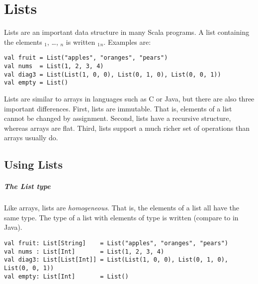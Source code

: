 \chapter{Lists}

Lists are an important data structure in many Scala programs.  
A list containing the elements $_1$, \ldots, $_n$ is written
$_1$$_n$\code{)}. Examples are:
\begin{lstlisting}
val fruit = List("apples", "oranges", "pears")
val nums  = List(1, 2, 3, 4)
val diag3 = List(List(1, 0, 0), List(0, 1, 0), List(0, 0, 1))
val empty = List()
\end{lstlisting}
Lists are similar to arrays in languages such as C or Java, but there
are also three important differences. First, lists are immutable. That
is, elements of a list cannot be changed by assignment. Second, 
lists have a recursive structure, whereas arrays are flat. Third,
lists support a much richer set of operations than arrays usually do.

\section{Using Lists}

\paragraph{The List type}
Like arrays, lists are {\em homogeneous}. That is, the elements of a
list all have the same type.  The type of a list with elements of type
 is written  (compare to  in Java).
\begin{lstlisting}
val fruit: List[String]    = List("apples", "oranges", "pears")
val nums : List[Int]       = List(1, 2, 3, 4)
val diag3: List[List[Int]] = List(List(1, 0, 0), List(0, 1, 0), List(0, 0, 1))
val empty: List[Int]       = List()
\end{lstlisting}

